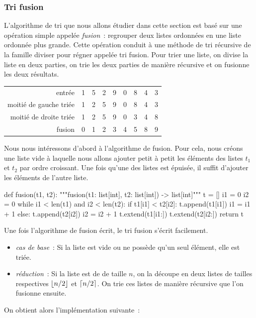 \documentclass{magnoliaold}
\begin{document}
\subsubsection{Tri fusion}

L'algorithme de tri que nous allons étudier dans cette section est basé sur une opération
simple appelée \emph{fusion}~: regrouper deux listes ordonnées en une liste
ordonnée plus grande. Cette opération conduit à une méthode de tri récursive 
de la famille \og diviser pour régner \fg appelée
tri fusion. Pour trier une liste, on divise la liste en deux parties, on
trie les deux parties de manière récursive et on fusionne les deux résultats.

\begin{center}
  \begin{tabular}{|r|c|c|c|c|c|c|c|c|}
  \hline
  entrée & 1 & 5 & 2 & 9 & 0 & 8 & 4 & 3\\
  moitié de gauche triée & \color{blue}1 & \color{blue}2 & \color{blue}5 & \color{blue}9 & \color{gray}0 & \color{gray}8 & \color{gray}4 & \color{gray}3\\
  moitié de droite triée & \color{gray}1 & \color{gray}2 & \color{gray}5 & \color{gray}9 & \color{red}0 & \color{red}3 & \color{red}4 & \color{red}8\\ 
  fusion & \color{red}0 & \color{blue}1 & \color{blue}2 & \color{red}3 & \color{red}4 & \color{blue}5 & \color{red}8 & \color{blue}9\\
  \hline
  \end{tabular}
  \end{center}
  
  Nous nous intéressons d'abord à l'algorithme de fusion.
  Pour cela, nous créons une liste vide à laquelle nous allons ajouter petit à petit les
  éléments des listes $t_1$ et $t_2$ par ordre croissant. Une fois qu'une des listes
  est épuisée, il suffit d'ajouter les éléments de l'autre liste.

\begin{pythoncode}
def fusion(t1, t2):
    """fusion(t1: list[int], t2: list[int]) -> list[int]"""
    t = []
    i1 = 0
    i2 = 0
    while i1 < len(t1) and i2 < len(t2):
        if t1[i1] < t2[i2]:
            t.append(t1[i1])
            i1 = i1 + 1
        else:
            t.append(t2[i2])
            i2 = i2 + 1
    t.extend(t1[i1:])
    t.extend(t2[i2:])
    return t
\end{pythoncode}

Une fois l'algorithme de fusion écrit, le tri fusion s'écrit facilement.
\begin{itemize}
\item \emph{cas de base}~: Si la liste est vide ou ne possède qu'un seul élément,
  elle est triée.
\item \emph{réduction}~: Si la liste est de de taille $n$, on la découpe en deux
  listes de tailles respectives $\left\lfloor n/2\right\rfloor$ et $\left\lceil n/2\right\rceil$. On trie ces listes
  de manière récursive que l'on fusionne ensuite.
\end{itemize}
On obtient alors l'implémentation suivante~:
\end{document}
